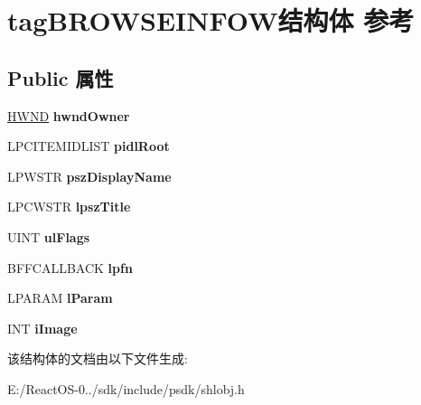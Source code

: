 \hypertarget{structtag_b_r_o_w_s_e_i_n_f_o_w}{}\section{tag\+B\+R\+O\+W\+S\+E\+I\+N\+F\+O\+W结构体 参考}
\label{structtag_b_r_o_w_s_e_i_n_f_o_w}
\subsection*{Public 属性}
\begin{DoxyCompactItemize}
\item 
\mbox{\label{structtag_b_r_o_w_s_e_i_n_f_o_w_a43313c27c1e7ca9e6301e8dcc2204e6b}} 
\hyperlink{interfacevoid}{H\+W\+ND} {\bfseries hwnd\+Owner}
\item 
\mbox{\label{structtag_b_r_o_w_s_e_i_n_f_o_w_a87a107a10a8c275fe14c8e3271086c91}} 
L\+P\+C\+I\+T\+E\+M\+I\+D\+L\+I\+ST {\bfseries pidl\+Root}
\item 
\mbox{\label{structtag_b_r_o_w_s_e_i_n_f_o_w_a30c9a9196412ca29b80023a694d26799}} 
L\+P\+W\+S\+TR {\bfseries psz\+Display\+Name}
\item 
\mbox{\label{structtag_b_r_o_w_s_e_i_n_f_o_w_ab99c0387fc84b4a32c488afd3b49c15c}} 
L\+P\+C\+W\+S\+TR {\bfseries lpsz\+Title}
\item 
\mbox{\label{structtag_b_r_o_w_s_e_i_n_f_o_w_a301b3d052711e13e331549ab862c343b}} 
U\+I\+NT {\bfseries ul\+Flags}
\item 
\mbox{\label{structtag_b_r_o_w_s_e_i_n_f_o_w_a22cf5e8999bedddde272d6a45b24dc21}} 
B\+F\+F\+C\+A\+L\+L\+B\+A\+CK {\bfseries lpfn}
\item 
\mbox{\label{structtag_b_r_o_w_s_e_i_n_f_o_w_aecd1166f54ccd3f2474a1bfef964167e}} 
L\+P\+A\+R\+AM {\bfseries l\+Param}
\item 
\mbox{\label{structtag_b_r_o_w_s_e_i_n_f_o_w_ae09191027f2dddff99a47f8a374bf961}} 
I\+NT {\bfseries i\+Image}
\end{DoxyCompactItemize}


该结构体的文档由以下文件生成\+:\begin{DoxyCompactItemize}
\item 
E\+:/\+React\+O\+S-\/0../sdk/include/psdk/shlobj.\+h\end{DoxyCompactItemize}

